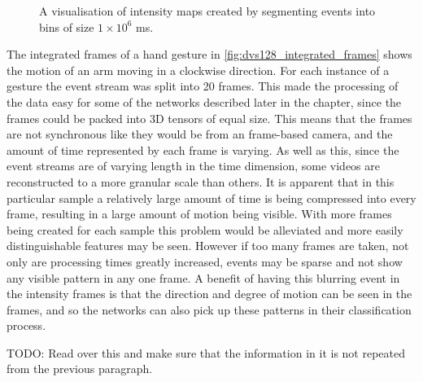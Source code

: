 \begin{figure}[htb]
    \caption{A visualisation of intensity maps created by segmenting events into bins of size $ 1 \times 10^6 $ ms.}%
    \label{fig:nmnist_spikes_to_intensity_map}%
\end{figure}

The integrated frames of a hand gesture in \cref{fig:dvs128_integrated_frames} shows the motion of an arm moving in a clockwise direction. For each instance of a gesture the event stream was split into 20 frames. This made the processing of the data easy for some of the networks described later in the chapter, since the frames could be packed into 3D tensors of equal size. This means that the frames are not synchronous like they would be from an frame-based camera, and the amount of time represented by each frame is varying. As well as this, since the event streams are of varying length in the time dimension, some videos are reconstructed to a more granular scale than others. It is apparent that in this particular sample a relatively large amount of time is being compressed into every frame, resulting in a large amount of motion being visible. With more frames being created for each sample this problem would be alleviated and more easily distinguishable features may be seen. However if too many frames are taken, not only are processing times greatly increased, events may be sparse and not show any visible pattern in any one frame. A benefit of having this blurring event in the intensity frames is that the direction and degree of motion can be seen in the frames, and so the networks can also pick up these patterns in their classification process.

\color{red} TODO: Read over this and make sure that the information in it is not repeated from the previous paragraph. \color{black}

